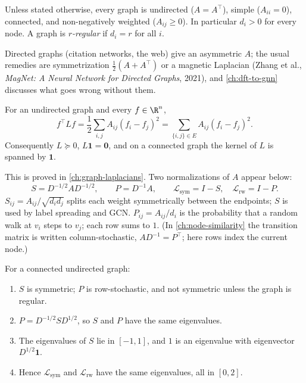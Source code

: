 \begin{notechapter}
\begin{definition}
\label{semi-supervised-graphs:def:standing}
Unless stated otherwise, every graph is undirected ($A = A^\top$), simple ($A_{ii} = 0$), connected, and non-negatively weighted ($A_{ij} \ge 0$). In particular $d_i > 0$ for every node. A graph is \emph{$r$-regular} if $d_i = r$ for all $i$.
\end{definition}

Directed graphs (citation networks, the web) give an asymmetric $A$; the usual remedies are symmetrization $\frac12(A + A^\top)$ or a magnetic Laplacian (Zhang et al., \emph{MagNet: A Neural Network for Directed Graphs}, 2021), and \cref{ch:dft-to-gnn} discusses what goes wrong without them.

\begin{theorem}
\label{semi-supervised-graphs:thm:laplacian_quadratic}
For an undirected graph and every $f \in \R^n$,
\begin{equation}
\label{semi-supervised-graphs:eq:quad_form}
f^\top L f = \frac{1}{2}\sum_{i,j} A_{ij}(f_i - f_j)^2 = \sum_{\{i,j\}\in E} A_{ij}(f_i - f_j)^2 .
\end{equation}
Consequently $L \succeq 0$, $L\mathbf 1 = \mathbf 0$, and on a connected graph the kernel of $L$ is spanned by $\mathbf 1$.
\end{theorem}

This is proved in \cref{ch:graph-laplacians}. Two normalizations of $A$ appear below:
\begin{equation}
S = D^{-1/2}AD^{-1/2}, \qquad P = D^{-1}A, \qquad \mathcal L_{\mathrm{sym}} = I - S, \quad \mathcal L_{\mathrm{rw}} = I - P .
\end{equation}
$S_{ij} = A_{ij}/\sqrt{d_id_j}$ splits each weight symmetrically between the endpoints; $S$ is used by label spreading and GCN. $P_{ij} = A_{ij}/d_i$ is the probability that a random walk at $v_i$ steps to $v_j$; each row sums to $1$. (In \cref{ch:node-similarity} the transition matrix is written column-stochastic, $AD^{-1} = P^\top$; here rows index the current node.)

\begin{proposition}
\label{semi-supervised-graphs:prop:normalized_properties}
For a connected undirected graph:
\begin{enumerate}
    \item $S$ is symmetric; $P$ is row-stochastic, and not symmetric unless the graph is regular.
    \item $P = D^{-1/2}SD^{1/2}$, so $S$ and $P$ have the same eigenvalues.
    \item The eigenvalues of $S$ lie in $[-1, 1]$, and $1$ is an eigenvalue with eigenvector $D^{1/2}\mathbf 1$.
    \item Hence $\mathcal L_{\mathrm{sym}}$ and $\mathcal L_{\mathrm{rw}}$ have the same eigenvalues, all in $[0, 2]$.
\end{enumerate}
\end{proposition}


\end{notechapter}
